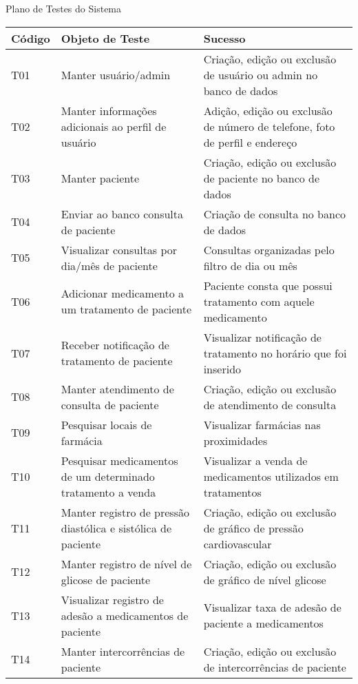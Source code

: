 \begin{quadro}
    \caption{\label{quadro_plano_testes}Plano de Testes do Sistema}
    \begin{tabular}{|l|p{7cm}|p{6cm}|}
        \hline
        \textbf{Código} & \textbf{Objeto de Teste} & \textbf{Sucesso} \\ \hline
        T01 & Manter usuário/admin & Criação, edição ou exclusão de usuário ou admin no banco de dados \\ \hline
        T02 & Manter informações adicionais ao perfil de usuário & Adição, edição ou exclusão de número de telefone, foto de perfil e endereço \\ \hline
        T03 & Manter paciente & Criação, edição ou exclusão de paciente no banco de dados \\ \hline
        T04 & Enviar ao banco consulta de paciente & Criação de consulta no banco de dados \\ \hline
        T05 & Visualizar consultas por dia/mês de paciente & Consultas organizadas pelo filtro de dia ou mês \\ \hline
        T06 & Adicionar medicamento a um tratamento de paciente & Paciente consta que possui tratamento com aquele medicamento \\ \hline
        T07 & Receber notificação de tratamento de paciente & Visualizar notificação de tratamento no horário que foi inserido \\ \hline
        T08 & Manter atendimento de consulta de paciente & Criação, edição ou exclusão de atendimento de consulta \\ \hline
        T09 & Pesquisar locais de farmácia & Visualizar farmácias nas proximidades \\ \hline
        T10 & Pesquisar medicamentos de um determinado tratamento a venda & Visualizar a venda de medicamentos utilizados em tratamentos \\ \hline
        T11 & Manter registro de pressão diastólica e sistólica de paciente & Criação, edição ou exclusão de gráfico de pressão cardiovascular \\ \hline
        T12 & Manter registro de nível de glicose de paciente & Criação, edição ou exclusão de gráfico de nível glicose \\ \hline
        T13 & Visualizar registro de adesão a medicamentos de paciente & Visualizar taxa de adesão de paciente a medicamentos \\ \hline
        T14 & Manter intercorrências de paciente & Criação, edição ou exclusão de intercorrências de paciente \\ \hline
    \end{tabular}
\end{quadro}
